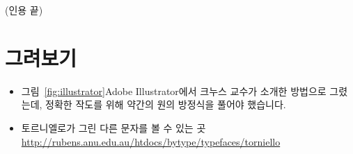 \bigskip
(인용 끝)


\section{그려보기}

\begin{itemize}

\item 그림~\ref{fig:illustrator}\은 \textsf{Adobe Illustrator}에서
  크누스 교수가 소개한 방법으로 그렸는데, 정확한 작도를 위해 약간의 원의 방정식을 풀어야 했습니다. 

\item 토르니엘로가 그린 다른  문자를 볼 수 있는 곳\\
	\url{http://rubens.anu.edu.au/htdocs/bytype/typefaces/torniello}

\end{itemize}

\begin{figure}
\end{figure}

